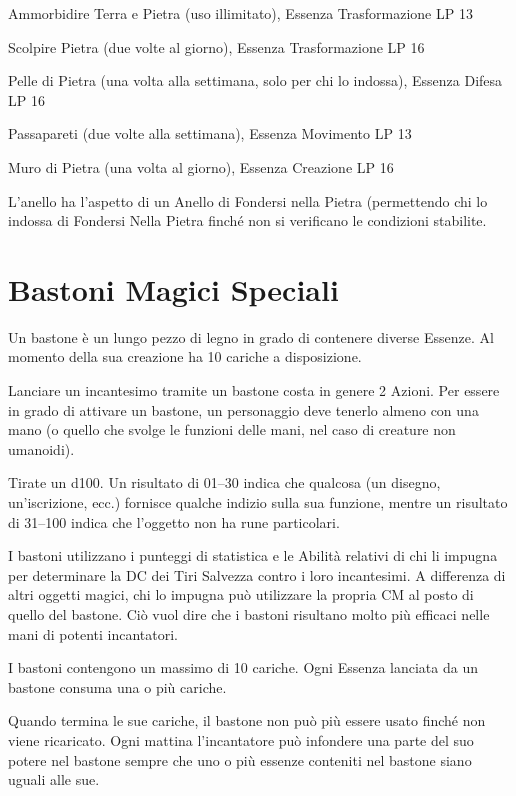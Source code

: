 \documentclass[a4paper,11pt,twoside,openany]{book}
\begin{document}
{Ammorbidire Terra e Pietra (uso illimitato), Essenza Trasformazione LP 13

Scolpire Pietra (due volte al giorno), Essenza Trasformazione LP 16

Pelle di Pietra (una volta alla settimana, solo per chi lo indossa), Essenza Difesa LP 16

Passapareti (due volte alla settimana), Essenza Movimento LP 13

Muro di Pietra (una volta al giorno), Essenza Creazione LP 16

L'anello ha l'aspetto di un Anello di Fondersi nella Pietra (permettendo chi lo indossa di Fondersi Nella Pietra finché non si verificano le condizioni stabilite.

\pagebreak

\section{Bastoni Magici Speciali}

\label{bastoni-magici-speciali}

Un bastone è un lungo pezzo di legno in grado di contenere diverse Essenze. Al momento della sua creazione ha 10 cariche a disposizione.

Lanciare un incantesimo tramite un bastone costa in genere 2 Azioni. Per essere in grado di attivare un bastone, un personaggio deve tenerlo almeno con una mano (o quello che svolge le funzioni delle mani, nel caso di creature non umanoidi).

Tirate un d100. Un risultato di 01--30 indica che qualcosa (un disegno, un'iscrizione, ecc.) fornisce qualche indizio sulla sua funzione, mentre un risultato di 31--100 indica che l'oggetto non ha rune particolari.

I bastoni utilizzano i punteggi di statistica e le Abilità relativi di chi li impugna per determinare la DC dei Tiri Salvezza contro i loro incantesimi. A differenza di altri oggetti magici, chi lo impugna può utilizzare la propria CM al posto di quello del bastone. Ciò vuol dire che i bastoni risultano molto più efficaci nelle mani di potenti incantatori.

I bastoni contengono un massimo di 10 cariche. Ogni Essenza lanciata
da un bastone consuma una o più cariche.

Quando termina le sue cariche, il bastone non può più essere usato finché non viene ricaricato. Ogni mattina l'incantatore può infondere una parte del suo potere nel bastone sempre che uno o più essenze conteniti nel bastone siano uguali alle sue.

}
\end{document}
